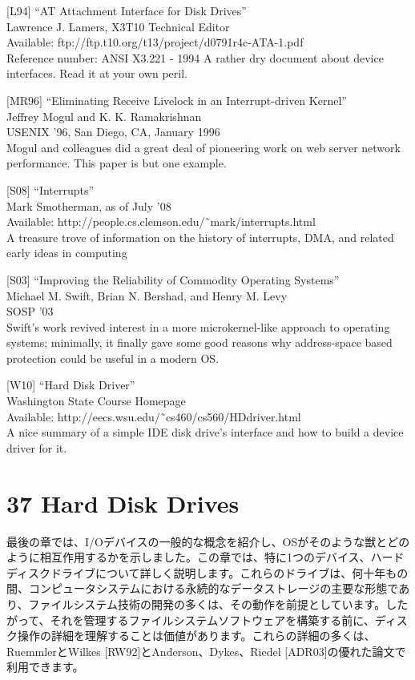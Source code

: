 {[}L94{]} ``AT Attachment Interface for Disk Drives''\\
Lawrence J. Lamers, X3T10 Technical Editor\\
Available: ftp://ftp.t10.org/t13/project/d0791r4c-ATA-1.pdf\\
Reference number: ANSI X3.221 - 1994 A rather dry document about device
interfaces. Read it at your own peril.

{[}MR96{]} ``Eliminating Receive Livelock in an Interrupt-driven
Kernel''\\
Jeffrey Mogul and K. K. Ramakrishnan\\
USENIX '96, San Diego, CA, January 1996\\
Mogul and colleagues did a great deal of pioneering work on web server
network performance. This paper is but one example.

{[}S08{]} ``Interrupts''\\
Mark Smotherman, as of July '08\\
Available: http://people.cs.clemson.edu/˜mark/interrupts.html\\
A treasure trove of information on the history of interrupts, DMA, and
related early ideas in computing

{[}S03{]} ``Improving the Reliability of Commodity Operating Systems''\\
Michael M. Swift, Brian N. Bershad, and Henry M. Levy\\
SOSP '03\\
Swift's work revived interest in a more microkernel-like approach to
operating systems; minimally, it finally gave some good reasons why
address-space based protection could be useful in a modern OS.

{[}W10{]} ``Hard Disk Driver''\\
Washington State Course Homepage\\
Available: http://eecs.wsu.edu/˜cs460/cs560/HDdriver.html\\
A nice summary of a simple IDE disk drive's interface and how to build a
device driver for it.

\hypertarget{hard-disk-drives}{%
\section*{37 Hard Disk Drives}\label{hard-disk-drives}}

最後の章では、I/Oデバイスの一般的な概念を紹介し、OSがそのような獣とどのように相互作用するかを示しました。この章では、特に1つのデバイス、ハードディスクドライブについて詳しく説明します。これらのドライブは、何十年もの間、コンピュータシステムにおける永続的なデータストレージの主要な形態であり、ファイルシステム技術の開発の多くは、その動作を前提としています。したがって、それを管理するファイルシステムソフトウェアを構築する前に、ディスク操作の詳細を理解することは価値があります。これらの詳細の多くは、RuemmlerとWilkes
{[}RW92{]}とAnderson、Dykes、Riedel
{[}ADR03{]}の優れた論文で利用できます。

